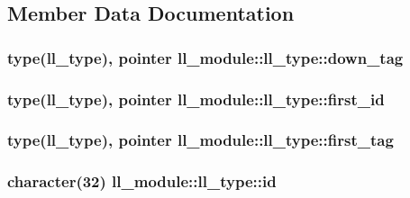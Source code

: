 \subsection{Member Data Documentation}
\subsubsection[{\texorpdfstring{down\+\_\+tag}{down_tag}}]{\setlength{\rightskip}{0pt plus 5cm}type({\bf ll\+\_\+type}), pointer ll\+\_\+module\+::ll\+\_\+type\+::down\+\_\+tag}\hypertarget{structll__module_1_1ll__type_a109f4a1fc222502095c755cce2742a35}{}\label{structll__module_1_1ll__type_a109f4a1fc222502095c755cce2742a35}
\subsubsection[{\texorpdfstring{first\+\_\+id}{first_id}}]{\setlength{\rightskip}{0pt plus 5cm}type({\bf ll\+\_\+type}), pointer ll\+\_\+module\+::ll\+\_\+type\+::first\+\_\+id}\hypertarget{structll__module_1_1ll__type_a5f4aff1485cdccd51cacbe1faac6ef21}{}\label{structll__module_1_1ll__type_a5f4aff1485cdccd51cacbe1faac6ef21}
\subsubsection[{\texorpdfstring{first\+\_\+tag}{first_tag}}]{\setlength{\rightskip}{0pt plus 5cm}type({\bf ll\+\_\+type}), pointer ll\+\_\+module\+::ll\+\_\+type\+::first\+\_\+tag}\hypertarget{structll__module_1_1ll__type_ae9e4c15f89cc0b4c9d6cea9acf5fb0c8}{}\label{structll__module_1_1ll__type_ae9e4c15f89cc0b4c9d6cea9acf5fb0c8}
\subsubsection[{\texorpdfstring{id}{id}}]{\setlength{\rightskip}{0pt plus 5cm}character(32) ll\+\_\+module\+::ll\+\_\+type\+::id}\hypertarget{structll__module_1_1ll__type_aba121ee1152cbef3575b7ec86a79f8c0}{}\label{structll__module_1_1ll__type_aba121ee1152cbef3575b7ec86a79f8c0}
